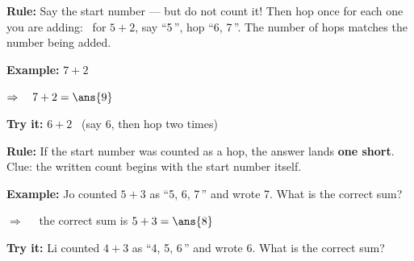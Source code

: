 \documentclass[12pt]{article}
\begin{document}


\begin{formulabox}
\textbf{Rule:} Say the start number --- but do not count it! Then hop once
for each one you are adding: \ for $5+2$, say ``5\,'', hop ``6, 7\,''.
The number of hops matches the number being added.
\end{formulabox}

\begin{examplebox}
\textbf{Example:} \quad $7 + 2$

$\Rightarrow\quad 7 + 2 = \ans{9}$
\end{examplebox}

\begin{tryitbox}
\textbf{Try it:} \quad $6 + 2$ \ (say 6, then hop two times)\\[2pt]
\end{tryitbox}


\begin{formulabox}
\textbf{Rule:} If the start number was counted as a hop, the answer lands
\textbf{one short}. Clue: the written count begins with the start number
itself.
\end{formulabox}

\begin{examplebox}
\textbf{Example:} \quad Jo counted $5+3$ as ``5, 6, 7\,'' and wrote 7. What
is the correct sum?

$\Rightarrow\quad$ the correct sum is $5 + 3 = \ans{8}$
\end{examplebox}

\begin{tryitbox}
\textbf{Try it:} \quad Li counted $4+3$ as ``4, 5, 6\,'' and wrote 6. What
is the correct sum?\\[2pt]
\end{tryitbox}
\end{document}
